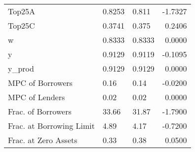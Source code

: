 \begin{table}
\begin{tabular}{lllr}
                  Top25A &  0.8253 &    0.811 & -1.7327 \\
                  Top25C &  0.3741 &    0.375 &  0.2406 \\
                       w &  0.8333 &   0.8333 &  0.0000 \\
                       y &  0.9129 &   0.9119 & -0.1095 \\
                  y\_prod &  0.9129 &   0.9129 &  0.0000 \\
        MPC of Borrowers &    0.16 &     0.14 & -0.0200 \\
          MPC of Lenders &    0.02 &     0.02 &  0.0000 \\
      Frac. of Borrowers &   33.66 &    31.87 & -1.7900 \\
Frac. at Borrowing Limit &    4.89 &     4.17 & -0.7200 \\
    Frac. at Zero Assets &    0.33 &     0.38 &  0.0500 \\
\bottomrule
\end{tabular}
\end{table}
